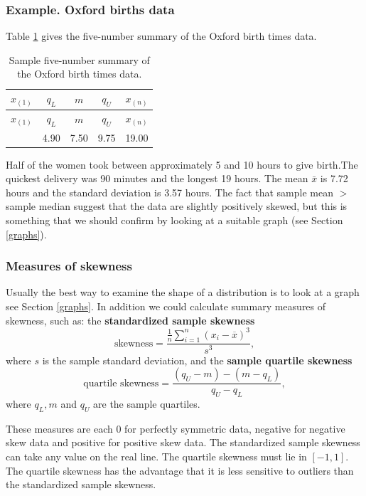 \documentclass[
  british,
  11pt,
  openany, a4paper]{book}
\begin{document}
\subsubsection*{Example. Oxford births data}\label{example.-oxford-births-data}

Table \ref{tab:oxfivenum} gives the five-number summary of the Oxford birth times data.

\begin{longtable}[]{@{}ccccc@{}}
\caption{\label{tab:oxfivenum} Sample five-number summary of the Oxford birth times data.}\tabularnewline
\toprule\noalign{}
\(x_{(1)}\) & \(q_L\) & \(m\) & \(q_U\) & \(x_{(n)}\) \\
\midrule\noalign{}
\endfirsthead
\toprule\noalign{}
\(x_{(1)}\) & \(q_L\) & \(m\) & \(q_U\) & \(x_{(n)}\) \\
\midrule\noalign{}
\endhead
\bottomrule\noalign{}
\endlastfoot
1.50 & 4.90 & 7.50 & 9.75 & 19.00 \\
\end{longtable}

Half of the women took between approximately 5 and 10 hours to give birth.The quickest delivery was 90 minutes and the longest 19 hours. The mean \(\bar{x}\) is 7.72 hours and the standard deviation is 3.57 hours. The fact that sample mean \(>\) sample median suggest that the data are slightly positively skewed, but this is something that we should confirm by looking at a suitable graph (see Section \ref{graphs}).

\subsubsection*{Measures of skewness}\label{measures-of-skewness}

Usually the best way to examine the shape of a distribution is to look at a graph see Section \ref{graphs}. In addition we could calculate summary measures of skewness, such as: the \textbf{standardized sample skewness}
\[\text{skewness} = \frac{\displaystyle\frac1n \sum_{i=1}^n (x_i-
\overline{x})^3}{s^3}, \]
where \(s\) is the sample standard deviation, and the \textbf{sample quartile
skewness}
\[\text{quartile skewness} = \frac{(q_U-m)-(m-q_L)}{q_U-q_L}, \]
where \(q_L, m\) and \(q_U\) are the sample quartiles.

These measures are each 0 for perfectly symmetric data, negative for negative skew data and positive for positive skew data. The standardized sample skewness can take any value on the real line. The quartile skewness must lie in \([-1, 1]\). The quartile skewness has the advantage that it is less sensitive to outliers than the standardized sample skewness.
\end{document}
